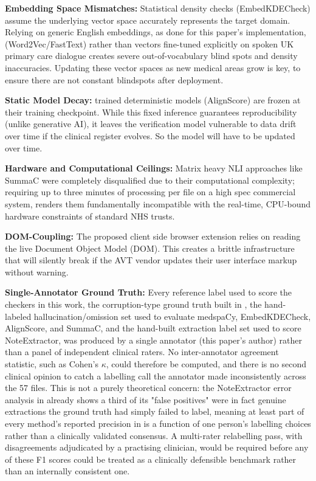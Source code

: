 \documentclass[11pt,a4paper]{article}
\begin{document}
\textbf{Embedding Space Mismatches:} Statistical density checks (EmbedKDECheck) assume the underlying vector space accurately represents the target domain. Relying on generic English embeddings, as done for this paper's implementation, (Word2Vec/FastText) rather than vectors fine-tuned explicitly on spoken UK primary care dialogue creates severe out-of-vocabulary blind spots and density inaccuracies. Updating these vector spaces as new medical areas grow is key, to ensure there are not constant blindspots after deployment.

\textbf{Static Model Decay:} trained deterministic models (AlignScore) are frozen at their training checkpoint. While this fixed inference guarantees reproducibility (unlike generative AI), it leaves the verification model vulnerable to data drift over time if the clinical register evolves. So the model will have to be updated over time.  

\textbf{Hardware and Computational Ceilings:} Matrix heavy NLI approaches like SummaC were completely disqualified due to their computational complexity; requiring up to three minutes of processing per file on a high spec commercial system, renders them fundamentally incompatible with the real-time, CPU-bound hardware constraints of standard NHS trusts.  

\textbf{DOM-Coupling:} The proposed client side browser extension relies on reading the live Document Object Model (DOM). This creates a brittle infrastructure that will silently break if the AVT vendor updates their user interface markup without warning.

\textbf{Single-Annotator Ground Truth:} Every reference label used to score the checkers in this work, the corruption-type ground truth built in , the hand-labeled hallucination/omission set used to evaluate medspaCy, EmbedKDECheck, AlignScore, and SummaC, and the hand-built extraction label set used to score NoteExtractor, was produced by a single annotator (this paper's author) rather than a panel of independent clinical raters. No inter-annotator agreement statistic, such as Cohen's $\kappa$, could therefore be computed, and there is no second clinical opinion to catch a labelling call the annotator made inconsistently across the 57 files. This is not a purely theoretical concern: the NoteExtractor error analysis in  already shows a third of its "false positives" were in fact genuine extractions the ground truth had simply failed to label, meaning at least part of every method's reported precision in  is a function of one person's labelling choices rather than a clinically validated consensus. A multi-rater relabelling pass, with disagreements adjudicated by a practising clinician, would be required before any of these F1 scores could be treated as a clinically defensible benchmark rather than an internally consistent one.
\end{document}
